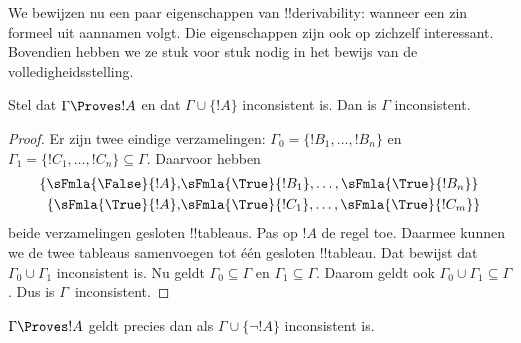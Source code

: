 \documentclass[../../../include/open-logic-section]{subfiles}
\begin{document}
      {}
      {}


We bewijzen nu een paar eigenschappen van !!{derivability}: wanneer
een zin formeel uit aannamen volgt. Die eigenschappen zijn ook op
zichzelf interessant. Bovendien hebben we ze stuk voor stuk nodig in
het bewijs van de volledigheidsstelling.

\begin{prop}
  Stel dat $\Gamma \Proves !A$ en dat $\Gamma \cup \{!A\}$
  inconsistent is. Dan is $\Gamma$ inconsistent.
\end{prop}

\begin{proof}
Er zijn twee eindige verzamelingen:
$\Gamma_0 = \{!B_1, \dots, !B_n\}$ en
$\Gamma_1 =\{!C_1, \dots, !C_n\} \subseteq \Gamma$. Daarvoor hebben
  \begin{align*}
    \{\sFmla{\False}{!A}, &
    \sFmla{\True}{!B_1}, \dots, \sFmla{\True}{!B_n}\} \\
    \{\sFmla{\True}{!A}, &
    \sFmla{\True}{!C_1}, \dots, \sFmla{\True}{!C_m}\}
  \end{align*}
  beide verzamelingen gesloten !!{tableau}s. Pas op $!A$ de regel
  \Cut{} toe. Daarmee kunnen we de twee tableaus samenvoegen tot één
  gesloten !!{tableau}. Dat bewijst dat
  $\Gamma_0 \cup \Gamma_1$ inconsistent is. Nu geldt
  $\Gamma_0 \subseteq \Gamma$ en $\Gamma_1 \subseteq \Gamma$. Daarom
  geldt ook $\Gamma_0 \cup \Gamma_1 \subseteq \Gamma$. Dus is
  $\Gamma$~inconsistent.
\end{proof}

\begin{prop}
$\Gamma \Proves !A$ geldt precies dan als
$\Gamma \cup \{\lnot !A\}$ inconsistent is.
\end{prop}
\end{document}
